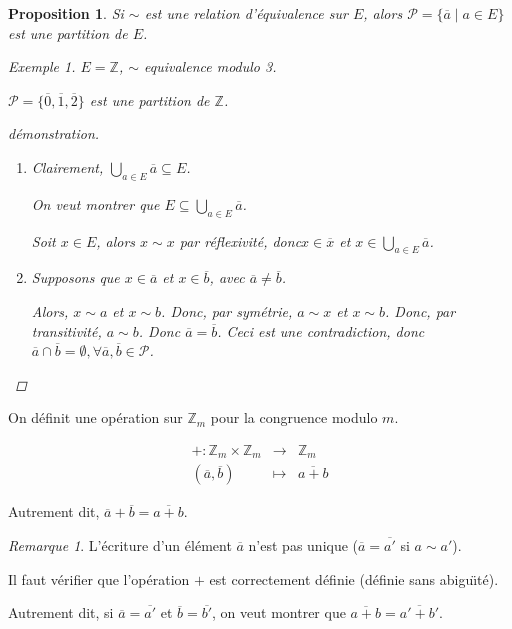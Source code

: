 \documentclass{report}
\newcommand*{\entiers}{\mathbb{Z}}
\newtheorem*{prop}{Proposition}
\theoremstyle{definition}
\theoremstyle{remark}
\newtheorem*{exem}{Exemple}
\newtheorem*{rema}{Remarque}
\begin{document}
	\begin{prop}
		Si $\sim$ est une relation d'\'equivalence sur $E$, alors $\mathcal{P} = \{\overline{a} \mid a \in E\}$ est une partition de $E$.
		\begin{exem}
			$E = \entiers$, $\sim$ equivalence modulo 3.

			$\mathcal{P} = \{\overline{0}, \overline{1}, \overline{2}\}$ est une partition de $\entiers$.
		\end{exem}
		\begin{proof}[d\'emonstration]~

			\begin{enumerate}[label=(\arabic*)]
				\item Clairement, $\bigcup\limits_{a \in E}\overline{a} \subseteq E$.

				On veut montrer que $E \subseteq \bigcup\limits_{a \in E}\overline{a}$.

				Soit $x \in E$, alors $x \sim x$ par r\'eflexivit\'e, donc$x \in \overline{x}$ et $x \in \bigcup\limits_{a \in E}\overline{a}$.
				\item Supposons que $x \in \overline{a}$ et $x \in \overline{b}$, avec $\overline{a} \neq \overline{b}$.

				Alors, $x \sim a$ et $x \sim b$. Donc, par sym\'etrie, $a \sim x$ et $x \sim b$. Donc, par transitivit\'e, $a \sim b$. Donc $\overline{a} = \overline{b}$. Ceci est une contradiction, donc $\overline{a} \cap \overline{b} = \emptyset, \forall \overline{a}, \overline{b} \in \mathcal{P}$.
			\end{enumerate}
		\end{proof}
	\end{prop}

	On d\'efinit une op\'eration sur $\entiers_m$ pour la congruence modulo $m$.

	\[
	\begin{array}{rcl}
		+:\entiers_m \times \entiers_m& \to& \entiers_m\\
		(\overline{a}, \overline{b})& \mapsto& \overline{a+b}
	\end{array}
	\]

	Autrement dit, $\overline{a} + \overline{b} = \overline{a+b}$.
	\begin{rema}
		L'\'ecriture d'un \'el\'ement $\overline{a}$ n'est pas unique ($\overline{a} = \overline{a'}$ si $a \sim a'$).
	\end{rema}

	Il faut v\'erifier que l'op\'eration $+$ est correctement d\'efinie (d\'efinie sans abigu\"\i t\'e).

	Autrement dit, si $\overline{a} = \overline{a'}$ et $\overline{b} = \overline{b'}$, on veut montrer que $\overline{a+b} = \overline{a'+b'}$.
\end{document}

